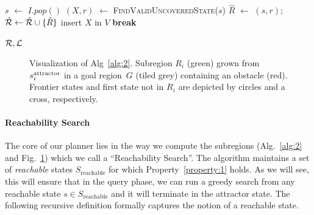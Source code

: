 \documentclass[a4paper,10pt]{article}
\begin{document}
\begin{algorithm}[t]
\begin{algorithmic}[1]
\vspace{2mm}        
        
         \label{alg:1:iv_loop}
            \State $s$ $\leftarrow$ $I.pop()$
            
\State $(X, r)$ $\leftarrow$ \textsc{FindValidUncoveredState}($s$)
                \State $\hat{R}$ $\leftarrow$ $(s,r)$;
        \hspace{2mm}
        $\hat{\mathcal{R}} \leftarrow \hat{\mathcal{R}} \cup \{ \hat{R} \}$   \label{alg:1:iv_region}
                    \label{alg:1:x_states}
                    \State insert $X$ in $V$
                    \State \textbf{break} \label{alg:1:break}
                \EndIf
            \EndIf
        \EndWhile
    \EndWhile

  \vspace{2mm}

  \State \Return $\mathcal{R}, \mathcal{L}$
\EndProcedure
\end{algorithmic}
\end{algorithm}

\begin{figure}[tb]
  \centering
  \caption{
  Visualization of Alg~\ref{alg:2}. Subregion $R_i$ (green) grown from $s^{\text{attractor}}_i$ in a goal region~$G$ (tiled grey) containing an obstacle (red).
  Frontier states and first state not in $R_i$ are depicted by circles and a cross, respectively.
}
    \label{fig:alg2}
\end{figure}

\paragraph{Reachability Search}
The core of our planner lies in the way we compute the subregions (Alg.~\ref{alg:2} and Fig.~\ref{fig:alg2}) which we call a ``Reachability Search''. The algorithm maintains a set of \emph{reachable} states $S_{\text{reachable}}$ for which Property~\ref{property:1} holds.
As we will see, this will ensure that in the query phase, we can run a greedy search from any reachable state $s \in S_{\text{reachable}}$ and it will terminate in the attractor state. 
%
The following recursive definition formally captures the notion of a reachable state.
\end{document}
